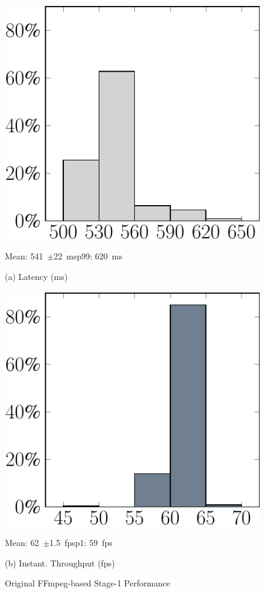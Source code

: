 \begin{figure}
\centering
\begin{minipage}[b]{0.49\linewidth}
\centering
\includegraphics[width=0.8\linewidth]{chapter5/FIGS/histo-stage1-latency.pdf}\\
\begin{captext}
\centering
Mean: 541~$\pm$22~ms\hspace{0.1in}p99: 620~ms\\
\end{captext}
{\small (a) Latency (ms)}
\end{minipage}
\begin{minipage}[b]{0.49\linewidth}
\centering
\includegraphics[width=0.8\linewidth]{chapter5/FIGS/histo-stage1-throughput.pdf}\\
\begin{captext}
\centering
Mean: 62~$\pm$1.5~fps\hspace{0.1in}p1: 59~fps\\
\end{captext}
{\small (b) Instant. Throughput (fps)}
\end{minipage}
\caption{Original FFmpeg-based Stage-1 Performance}
\label{fig:stage1-histo}
\end{figure}


